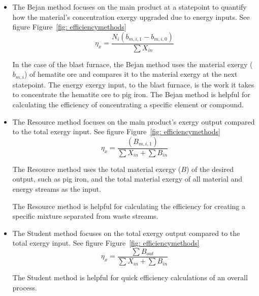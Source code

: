 \documentclass[energies,article,submit,pdftex,moreauthors]{Definitions/mdpi}
\begin{document}
\begin{itemize}
  \item The Bejan method focuses on the main product
  at a statepoint
  to quantify how the material's concentration exergy upgraded
  due to energy inputs.
  See figure Figure~\ref{fig: efficiencymethods}\\

  \begin{equation}\label{eq:Bejan Efficiency}
  \eta_{x} = \frac{N_i(b_{m,i,1} - b_{m,i,0})}{\sum{X_{in}}}
  \end{equation}

  In the case of the blast furnace,
  the Bejan method uses the material exergy ($b_{m,i}$)
  of hematite ore
  and compares it to the material exergy
  at the next statepoint.
  The energy exergy input, to the blast furnace,
  is the work it takes to concentrate the hematite ore
  to pig iron.
  The Bejan method is helpful
  for calculating the efficiency
  of concentrating a specific element or compound.

  \item The Resource method focuses on the main product's exergy output
  compared to the total exergy input.
  See figure Figure~\ref{fig: efficiencymethods}\\

  \begin{equation}\label{eq:Resource Efficiency}
  \eta_{x} = \frac{(B_{m,i,1})}{\sum{X_{in}}+\sum{B_{in}}}
  \end{equation}

  The Resource method uses the total material exergy ($B$) of the desired output,
  such as pig iron,
  and the total material exergy
  of all material and energy streams
  as the input.

  The Resource method is helpful
  for calculating the efficiency
  for creating a specific mixture separated
  from waste streams.\\

  \item The Student method focuses on the total exergy output
  compared to the total exergy input.
  See figure Figure~\ref{fig: efficiencymethods}\\

  \begin{equation}\label{eq:Student Efficiency}
  \eta_{x} = \frac{\sum{B_{out}}}{\sum{X_{in}} + \sum{B_{in}}}
  \end{equation}

  The Student method is helpful
  for quick efficiency calculations
  of an overall process.

\end{itemize}
\end{document}
